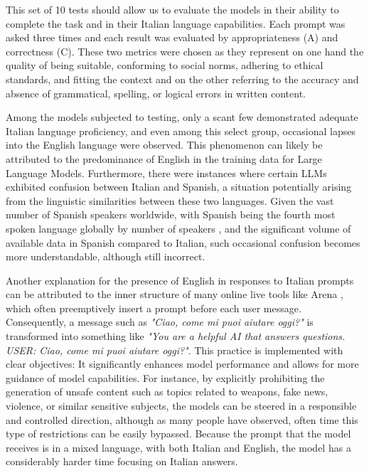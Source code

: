 This set of 10 tests should allow us to evaluate the models in their ability to complete the task and in their Italian language capabilities. Each prompt was asked three times and each result was evaluated by appropriateness (A) and correctness (C). These two metrics were chosen as they represent on one hand the quality of being suitable, conforming to social norms, adhering to ethical standards, and fitting the context and on the other referring to the accuracy and absence of grammatical, spelling, or logical errors in written content. 

% 
% 
Among the models subjected to testing, only a scant few demonstrated adequate Italian language proficiency, and even among this select group, occasional lapses into the English language were observed. This phenomenon can likely be attributed to the predominance of English in the training data for Large Language Models. Furthermore, there were instances where certain LLMs exhibited confusion between Italian and Spanish, a situation potentially arising from the linguistic similarities between these two languages. Given the vast number of Spanish speakers worldwide, with Spanish being the fourth most spoken language globally by number of speakers \cite{spanish-speakers}, and the significant volume of available data in Spanish compared to Italian, such occasional confusion becomes more understandable, although still incorrect.

Another explanation for the presence of English in responses to Italian prompts can be attributed to the inner structure of many online live tools like Arena \cite{arena}, which often preemptively insert a prompt before each user message. Consequently, a message such as \emph{"Ciao, come mi puoi aiutare oggi?"} is transformed into something like \emph{"You are a helpful AI that answers questions. USER: Ciao, come mi puoi aiutare oggi?"}. This practice is implemented with clear objectives: It significantly enhances model performance and allows for more guidance of model capabilities. For instance, by explicitly prohibiting the generation of unsafe content such as topics related to weapons, fake news, violence, or similar sensitive subjects, the models can be steered in a responsible and controlled direction, although as many people have observed, often time this type of restrictions can be easily bypassed. Because the prompt that the model receives is in a mixed language, with both Italian and English, the model has a considerably harder time focusing on Italian answers.

